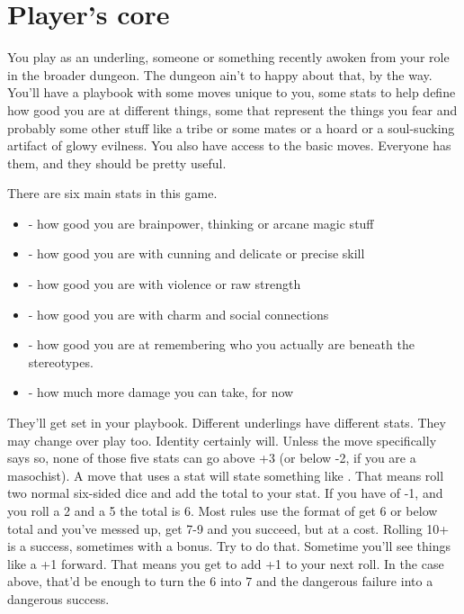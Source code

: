 \documentclass{tufte-book}
\begin{document}
\chapter{Player's core}

You play as an underling, someone or something recently awoken from your role in the broader dungeon. The dungeon ain't to happy about that, by the way. You'll have a playbook with some moves unique to you, some stats to help define how good you are at different things, some  that represent the things you fear and probably some other stuff like a tribe or some mates or a hoard or a soul-sucking artifact of glowy evilness. You also have access to the basic moves. Everyone has them, and they should be pretty useful.

There are six main stats in this game.
\begin{itemize}
\item {} - how good you are brainpower, thinking or arcane magic stuff
\item {} - how good you are with cunning and delicate or precise skill
\item {} - how good you are with violence or raw strength
\item {} - how good you are with charm and social connections
\item {} - how good you are at remembering who you actually are beneath the stereotypes.
\item {} - how much more damage you can take, for now
\end{itemize}

They'll get set in your playbook. Different underlings have different stats. They may change over play too. Identity certainly will. Unless the move specifically says so, none of those five stats can go above +3 (or below -2, if you are a masochist). A move that uses a stat will state something like . That means roll two  normal six-sided dice and add the total to your stat. If you have  of -1, and you roll a 2 and a 5 the total is 6. Most rules use the format of get 6 or below total and you've messed up, get 7-9 and you succeed, but at a cost. Rolling 10+ is a success, sometimes with a bonus. Try to do that.
Sometime you'll see things like a +1 forward. That means you get to add +1 to your next roll. In the case above, that'd be enough to turn the 6 into 7 and the dangerous failure into a dangerous success.
\end{document}
